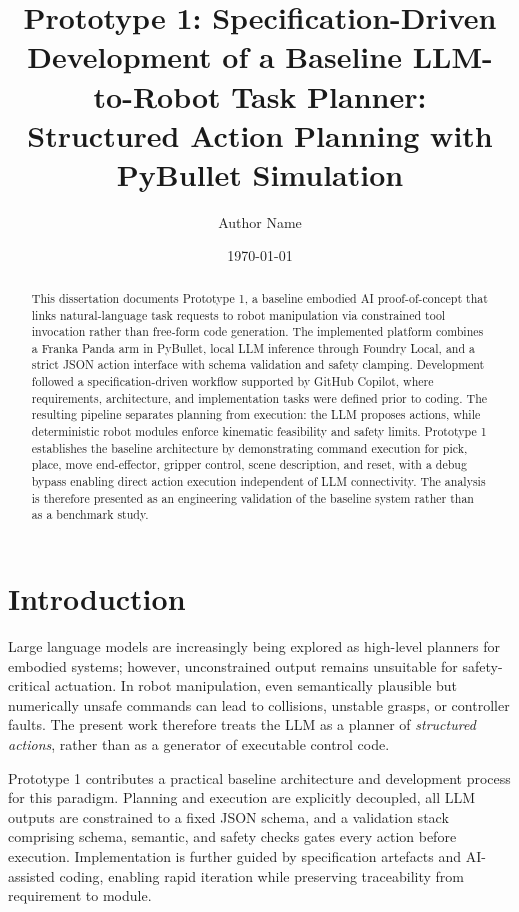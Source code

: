 \documentclass[12pt,a4paper]{article}
\title{Prototype 1: Specification-Driven Development of a Baseline LLM-to-Robot Task Planner: \\
Structured Action Planning with PyBullet Simulation}
\author{Author Name}
\date{\today}
\begin{document}
\maketitle

\begin{abstract}
This dissertation documents Prototype 1, a baseline embodied AI proof-of-concept that links natural-language task requests to robot manipulation via constrained tool invocation rather than free-form code generation. The implemented platform combines a Franka Panda arm in PyBullet, local LLM inference through Foundry Local, and a strict JSON action interface with schema validation and safety clamping. Development followed a specification-driven workflow supported by GitHub Copilot, where requirements, architecture, and implementation tasks were defined prior to coding. The resulting pipeline separates planning from execution: the LLM proposes actions, while deterministic robot modules enforce kinematic feasibility and safety limits. Prototype 1 establishes the baseline architecture by demonstrating command execution for pick, place, move end-effector, gripper control, scene description, and reset, with a debug bypass enabling direct action execution independent of LLM connectivity. The analysis is therefore presented as an engineering validation of the baseline system rather than as a benchmark study.
\end{abstract}

\section{Introduction}

Large language models are increasingly being explored as high-level planners for embodied systems; however, unconstrained output remains unsuitable for safety-critical actuation. In robot manipulation, even semantically plausible but numerically unsafe commands can lead to collisions, unstable grasps, or controller faults. The present work therefore treats the LLM as a planner of \emph{structured actions}, rather than as a generator of executable control code.

Prototype 1 contributes a practical baseline architecture and development process for this paradigm. Planning and execution are explicitly decoupled, all LLM outputs are constrained to a fixed JSON schema, and a validation stack comprising schema, semantic, and safety checks gates every action before execution. Implementation is further guided by specification artefacts and AI-assisted coding, enabling rapid iteration while preserving traceability from requirement to module.
\end{document}
